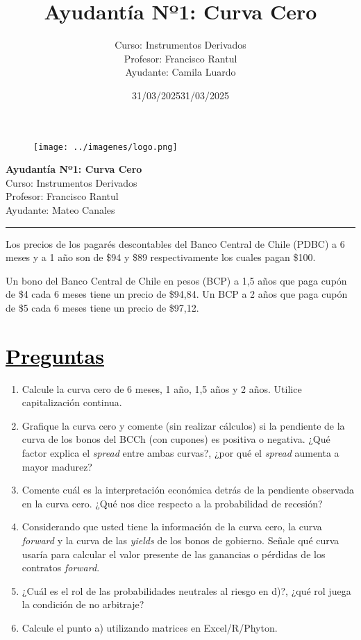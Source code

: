 \documentclass[12pt]{article}
\title{Ayudantía Nº1: Curva Cero}
\author{Curso: Instrumentos Derivados\\
Profesor: Francisco Rantul\\
Ayudante: Camila Luardo}
\date{31/03/2025}
\newcommand{\subrayadoRojo}[1]{{\color{rojoudp}\underline{\textcolor{black}{#1}}}}
\begin{document}
\begin{figure}
    \vspace{-5em}    
    \flushright
    \texttt{[image: ../imagenes/logo.png]}\\[-3em]
\end{figure}
\begin{center}
    {\LARGE \textbf{Ayudantía Nº1: Curva Cero}}\\[0.5em]
    Curso: Instrumentos Derivados\\
    Profesor: Francisco Rantul\\
    Ayudante: Mateo Canales\\
    \date{31/03/2025}
\end{center}
\vspace{1pt}
{\color{rojoudp}\hrule height 2pt}
\vspace{10pt}

Los precios de los pagarés descontables del Banco Central de Chile (PDBC)
 a 6 meses y a 1 año son de \$94 y \$89 respectivamente los cuales pagan \$100. 
  
 Un bono del Banco Central de Chile en pesos (BCP) a 1,5 años que paga cupón de 
 \$4 cada 6 meses tiene un precio de \$94{,}84. Un BCP a 2 años que paga
 cupón de \$5 cada 6 meses tiene un precio de \$97{,}12.

\section*{\subrayadoRojo{Preguntas}}

\begin{enumerate}[label=\textbf{\alph*)}]
    \item Calcule la curva cero de 6 meses, 1 año, 1,5 años y 2 años.
     Utilice capitalización continua.
    
    \item Grafique la curva cero y comente (sin realizar cálculos) si 
    la pendiente de la curva de los bonos del BCCh (con cupones) es 
    positiva o negativa. ¿Qué factor explica el \textit{spread} entre 
    ambas curvas?, ¿por qué el \textit{spread} aumenta a mayor madurez?
    
    \item Comente cuál es la interpretación económica detrás de la 
    pendiente observada en la curva cero. ¿Qué nos dice respecto a 
    la probabilidad de recesión?
    
    \item Considerando que usted tiene la información de la curva cero, 
    la curva \textit{forward} y la curva de las \textit{yields} de los 
    bonos de gobierno. Señale qué curva usaría para calcular el valor 
    presente de las ganancias o pérdidas de los contratos \textit{forward}.
    
    \item ¿Cuál es el rol de las probabilidades neutrales al riesgo en d)?, 
    ¿qué rol juega la condición de no arbitraje?
    
    \item Calcule el punto a) utilizando matrices en Excel/R/Phyton.
\end{enumerate}
\end{document}
